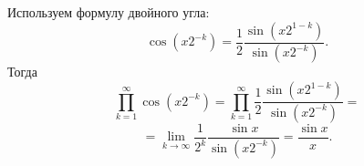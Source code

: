 \documentclass{article}
\begin{document}
Используем формулу двойного угла:
$$\cos (x2^{-k}) = \frac12 \frac{\sin (x2^{1-k})}{\sin (x2^{-k})}.$$
Тогда
$$\prod\limits_{k=1}^\infty \cos (x2^{-k}) = \prod\limits_{k=1}^\infty \frac12 \frac{\sin (x2^{1-k})}{\sin (x2^{-k})} = $$
$$= \lim_{k \to \infty} \frac{1}{2^k} \frac{\sin x}{\sin (x2^{-k})} = \frac{\sin x}{x}.$$
\end{document}
